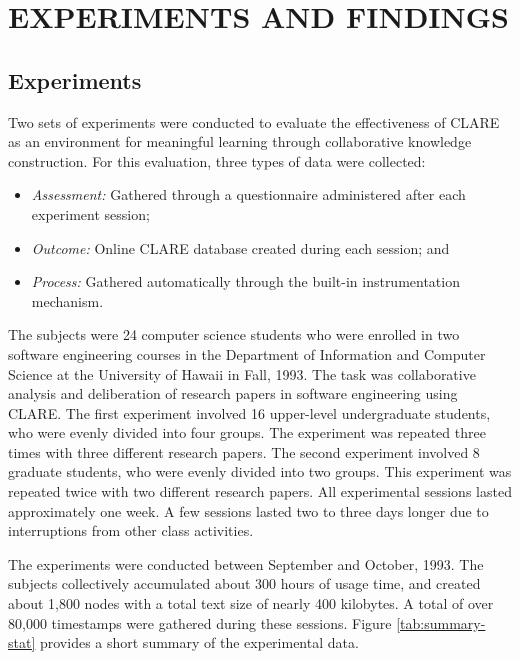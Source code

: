 \section{EXPERIMENTS AND FINDINGS}
\label{sec:findings}

\subsection{Experiments}

Two sets of experiments were conducted to evaluate the effectiveness of
CLARE as an environment for meaningful learning through collaborative
knowledge construction.  For this evaluation, three types of data were
collected:

\begin{itemize}
\item {\it Assessment:\/} Gathered through a questionnaire administered
  after each experiment session;
  
\item {\it Outcome:\/} Online CLARE database created during each session;
  and
  
\item {\it Process: \/} Gathered automatically through the built-in
  instrumentation mechanism. 
\end{itemize}

The subjects were 24 computer science students who were enrolled in two
software engineering courses in the Department of Information and Computer
Science at the University of Hawaii in Fall, 1993. The task was
collaborative analysis and deliberation of research papers in software
engineering using CLARE. The first experiment involved 16 upper-level
undergraduate students, who were evenly divided into four groups. The
experiment was repeated three times with three different research papers.
The second experiment involved 8 graduate students, who were evenly divided
into two groups. This experiment was repeated twice with two different
research papers. All experimental sessions lasted approximately one week. A
few sessions lasted two to three days longer due to interruptions from
other class activities.

The experiments were conducted between September and October, 1993. The
subjects collectively accumulated about 300 hours of usage time, and
created about 1,800 nodes with a total text size of nearly 400 kilobytes. A
total of over 80,000 timestamps were gathered during these sessions. Figure
\ref{tab:summary-stat} provides a short summary of the experimental data.


